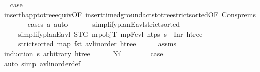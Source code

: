 \begin{isabellebody}
\ \isamarkupfalse%
\ {\isacharquery}{\kern0pt}case\ \isanewline
\ \ \ \ \ \ \isamarkupfalse%
\ insert{\isacharunderscore}{\kern0pt}happ{\isacharunderscore}{\kern0pt}to{\isacharunderscore}{\kern0pt}tree{\isacharunderscore}{\kern0pt}equiv{\isacharbrackleft}{\kern0pt}OF\ insert{\isacharunderscore}{\kern0pt}timed{\isacharunderscore}{\kern0pt}ground{\isacharunderscore}{\kern0pt}acts{\isacharunderscore}{\kern0pt}to{\isacharunderscore}{\kern0pt}tree{\isacharunderscore}{\kern0pt}strict{\isacharunderscore}{\kern0pt}sorted{\isacharbrackleft}{\kern0pt}OF\ Cons{\isachardot}{\kern0pt}prems{\isacharbrackright}{\kern0pt}{\isacharbrackright}{\kern0pt}\isanewline
\ \ \ \ \ \ \isamarkupfalse%
\ {\isacharparenleft}{\kern0pt}cases\ a{\isacharprime}{\kern0pt}{\isacharparenright}{\kern0pt}\ auto\isanewline
\ \ \isamarkupfalse%
%
\endisatagproof
{\isafoldproof}%
%
\isadelimproof
\isanewline
%
\endisadelimproof
\isanewline
\ \ \isamarkupfalse%
\ simplify{\isacharunderscore}{\kern0pt}planE{\isacharunderscore}{\kern0pt}avl{\isacharprime}{\kern0pt}{\isacharunderscore}{\kern0pt}strict{\isacharunderscore}{\kern0pt}sorted{\isacharcolon}{\kern0pt}\isanewline
\ \ \ \ \ {\isachardoublequoteopen}simplify{\isacharunderscore}{\kern0pt}planE{\isacharunderscore}{\kern0pt}avl{\isacharprime}{\kern0pt}\ STG\ mp{\isacharunderscore}{\kern0pt}objT\ mp{\isacharunderscore}{\kern0pt}Fevl\ htps\ {\isasympi}s\ {\isacharequal}{\kern0pt}\ Inr\ htree{\isachardoublequoteclose}\ \isanewline
\ \ \ \ \ {\isachardoublequoteopen}strict{\isacharunderscore}{\kern0pt}sorted\ {\isacharparenleft}{\kern0pt}map\ fst\ {\isacharparenleft}{\kern0pt}avl{\isacharunderscore}{\kern0pt}inorder\ htree{\isacharparenright}{\kern0pt}{\isacharparenright}{\kern0pt}{\isachardoublequoteclose}\isanewline
%
\isadelimproof
\ \ \ \ %
\endisadelimproof
%
\isatagproof
{}\isamarkupfalse%
\ assms\isanewline
\ \ \isamarkupfalse%
\ {\isacharparenleft}{\kern0pt}induction\ {\isasympi}s\ arbitrary{\isacharcolon}{\kern0pt}\ htree{\isacharparenright}{\kern0pt}\isanewline
\ \ \ \ \isamarkupfalse%
\ Nil\isanewline
\ \ \ \ \isamarkupfalse%
\ \isamarkupfalse%
\ {\isacharquery}{\kern0pt}case\ \isanewline
\ \ \ \ \ \ \isamarkupfalse%
\ {\isacharparenleft}{\kern0pt}auto\ simp{\isacharcolon}{\kern0pt}\ avl{\isacharunderscore}{\kern0pt}inorder{\isacharunderscore}{\kern0pt}def{\isacharparenright}{\kern0pt}\isanewline

\end{isabellebody}

